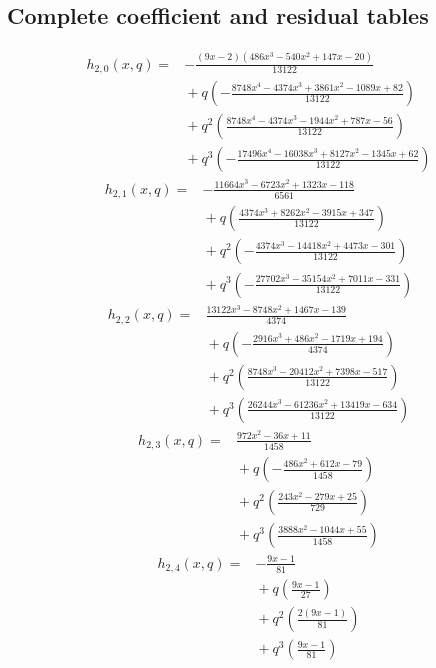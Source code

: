 \subsection{Complete coefficient and residual tables}
\[
\begin{split}
h_{2,0}(x,q)={}&- \frac{\left(9 x - 2\right) \left(486 x^{3} - 540 x^{2} + 147 x - 20\right)}{13122}\\
&{}+q\left(- \frac{8748 x^{4} - 4374 x^{3} + 3861 x^{2} - 1089 x + 82}{13122}\right)\\
&{}+q^{2}\left(\frac{8748 x^{4} - 4374 x^{3} - 1944 x^{2} + 787 x - 56}{13122}\right)\\
&{}+q^{3}\left(- \frac{17496 x^{4} - 16038 x^{3} + 8127 x^{2} - 1345 x + 62}{13122}\right)
\end{split}
\tag{ANP19}
\]
\[
\begin{split}
h_{2,1}(x,q)={}&- \frac{11664 x^{3} - 6723 x^{2} + 1323 x - 118}{6561}\\
&{}+q\left(\frac{4374 x^{3} + 8262 x^{2} - 3915 x + 347}{13122}\right)\\
&{}+q^{2}\left(- \frac{4374 x^{3} - 14418 x^{2} + 4473 x - 301}{13122}\right)\\
&{}+q^{3}\left(- \frac{27702 x^{3} - 35154 x^{2} + 7011 x - 331}{13122}\right)
\end{split}
\tag{ANP20}
\]
\[
\begin{split}
h_{2,2}(x,q)={}&\frac{13122 x^{3} - 8748 x^{2} + 1467 x - 139}{4374}\\
&{}+q\left(- \frac{2916 x^{3} + 486 x^{2} - 1719 x + 194}{4374}\right)\\
&{}+q^{2}\left(\frac{8748 x^{3} - 20412 x^{2} + 7398 x - 517}{13122}\right)\\
&{}+q^{3}\left(\frac{26244 x^{3} - 61236 x^{2} + 13419 x - 634}{13122}\right)
\end{split}
\tag{ANP21}
\]
\[
\begin{split}
h_{2,3}(x,q)={}&\frac{972 x^{2} - 36 x + 11}{1458}\\
&{}+q\left(- \frac{486 x^{2} + 612 x - 79}{1458}\right)\\
&{}+q^{2}\left(\frac{243 x^{2} - 279 x + 25}{729}\right)\\
&{}+q^{3}\left(\frac{3888 x^{2} - 1044 x + 55}{1458}\right)
\end{split}
\tag{ANP22}
\]
\[
\begin{split}
h_{2,4}(x,q)={}&- \frac{9 x - 1}{81}\\
&{}+q\left(\frac{9 x - 1}{27}\right)\\
&{}+q^{2}\left(\frac{2 \left(9 x - 1\right)}{81}\right)\\
&{}+q^{3}\left(\frac{9 x - 1}{81}\right)
\end{split}
\tag{ANP23}
\]
